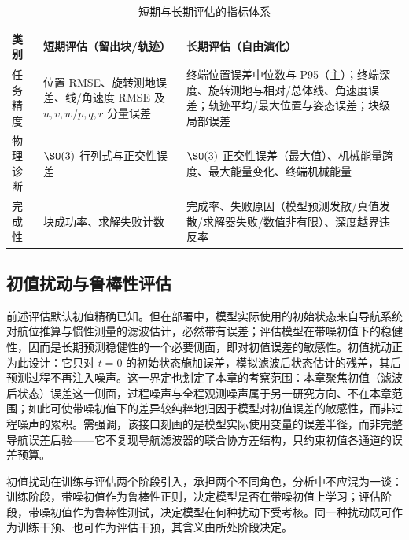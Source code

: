 \begin{table}[htbp]
  \centering
  \caption{短期与长期评估的指标体系}
  \label{tab:metrics}
  \begin{tabularx}{\textwidth}{>{\raggedright\arraybackslash}p{}>{\raggedright\arraybackslash}X>{\raggedright\arraybackslash}X}
    \toprule
    类别 & 短期评估（留出块/轨迹） & 长期评估（自由演化） \\
    \midrule
    任务精度 & 位置 RMSE、旋转测地误差、线/角速度 RMSE 及 \(u,v,w\)/\(p,q,r\) 分量误差 & 终端位置误差中位数与 P95（主）；终端深度、旋转测地与相对/总体线、角速度误差；轨迹平均/最大位置与姿态误差；块级局部误差 \\
    物理诊断 & \(\SO(3)\) 行列式与正交性误差 & \(\SO(3)\) 正交性误差（最大值）、机械能量跨度、最大能量变化、终端机械能量 \\
    完成性 & 块成功率、求解失败计数 & 完成率、失败原因（模型预测发散/真值发散/求解器失败/数值非有限）、深度越界违反率 \\
    \bottomrule
  \end{tabularx}
\end{table}

\subsection{初值扰动与鲁棒性评估}
\label{subsec:ic-perturbation}

前述评估默认初值精确已知。但在部署中，模型实际使用的初始状态来自导航系统对航位推算与惯性测量的滤波估计，必然带有误差；评估模型在带噪初值下的稳健性，因而是长期预测稳健性的一个必要侧面，即对初值误差的敏感性。初值扰动正为此设计：它只对 \(t=0\) 的初始状态施加误差，模拟滤波后状态估计的残差，其后预测过程不再注入噪声。这一界定也划定了本章的考察范围：本章聚焦初值（滤波后状态）误差这一侧面，过程噪声与全程观测噪声属于另一研究方向、不在本章范围；如此可使带噪初值下的差异较纯粹地归因于模型对初值误差的敏感性，而非过程噪声的累积。需强调，该接口刻画的是模型实际使用变量的误差半径，而非完整导航误差后验——它不复现导航滤波器的联合协方差结构，只约束初值各通道的误差预算。

初值扰动在训练与评估两个阶段引入，承担两个不同角色，分析中不应混为一谈：训练阶段，带噪初值作为鲁棒性正则，决定模型是否在带噪初值上学习；评估阶段，带噪初值作为鲁棒性测试，决定模型在何种扰动下受考核。同一种扰动既可作为训练干预、也可作为评估干预，其含义由所处阶段决定。

